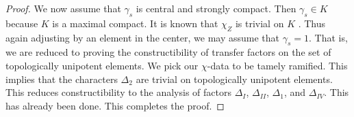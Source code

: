 \begin{proof}
We now assume that $\gamma_s$ is central and strongly compact.  Then $\gamma_s\in K$ because $K$ is a maximal compact.
It is known that $\chi_Z$ is trivial on $K$ \cite[Lemma 3.2]{hales1995fundamental}. Thus again adjusting by an element in the center,
we may assume that $\gamma_s=1$.  That is, we are reduced to proving the constructibility of transfer factors on the set of topologically
unipotent elements.  We pick our $\chi$-data to be tamely ramified.  This implies that the characters $\Delta_2$ are trivial
on topologically unipotent elements.  This reduces constructibility to the analysis of factors $\Delta_I$, $\Delta_{II}$, $\Delta_1$, and $\Delta_{IV}$.
This has already been done.  This completes the proof.
\end{proof}




